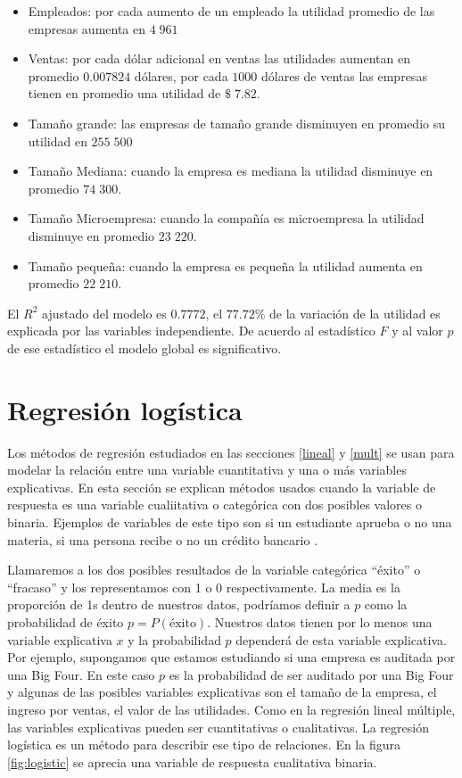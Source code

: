 \documentclass[letterpaper,]{book}
\providecommand{\tightlist}{%
  \setlength{\itemsep}{0pt}\setlength{\parskip}{0pt}}
\begin{document}
\begin{itemize}
\tightlist
\item
  Empleados: por cada aumento de un empleado la utilidad promedio de las empresas aumenta en \(4\;961\)
\item
  Ventas: por cada dólar adicional en ventas las utilidades aumentan en promedio \(0.007824\) dólares, por cada \(1000\) dólares de ventas las empresas tienen en promedio una utilidad de \(\$\;7.82\).
\item
  Tamaño grande: las empresas de tamaño grande disminuyen en promedio su utilidad en \(255\;500\)
\item
  Tamaño Mediana: cuando la empresa es mediana la utilidad disminuye en promedio \(74\;300\).
\item
  Tamaño Microempresa: cuando la compañía es microempresa la utilidad disminuye en promedio \(23\;220\).
\item
  Tamaño pequeña: cuando la empresa es pequeña la utilidad aumenta en promedio \(22\;210\).
\end{itemize}

El \(R^2\) ajustado del modelo es \(0.7772\), el \(77.72\)\% de la variación de la utilidad es explicada por las variables independiente. De acuerdo al estadístico \(F\) y al valor \(p\) de ese estadístico el modelo global es significativo.

\hypertarget{regresion-logistica}{%
\section{Regresión logística}\label{regresion-logistica}}

Los métodos de regresión estudiados en las secciones \ref{lineal} y \ref{mult} se usan para modelar la relación entre una variable cuantitativa y una o más variables explicativas. En esta sección se explican métodos usados cuando la variable de respuesta es una variable cualiitativa o categórica con dos posibles valores o binaria. Ejemplos de variables de este tipo son si un estudiante aprueba o no una materia, si una persona recibe o no un crédito bancario \citep{kleinbaum2009}.

Llamaremos a los dos posibles resultados de la variable categórica ``éxito'' o ``fracaso'' y los representamos con 1 o 0 respectivamente. La media es la proporción de 1s dentro de nuestros datos, podríamos definir a \(p\) como la probabilidad de éxito \(p=P(\text{éxito})\). Nuestros datos tienen por lo menos una variable explicativa \(x\) y la probabilidad \(p\) dependerá de esta variable explicativa. Por ejemplo, supongamos que estamos estudiando si una empresa es auditada por una Big Four. En este caso \(p\) es la probabilidad de ser auditado por una Big Four y algunas de las posibles variables explicativas son el tamaño de la empresa, el ingreso por ventas, el valor de las utilidades. Como en la regresión lineal múltiple, las variables explicativas pueden ser cuantitativas o cualitativas. La regresión logística es un método para describir ese tipo de relaciones. En la figura \ref{fig:logistic} se aprecia una variable de respuesta cualitativa binaria.
\end{document}
